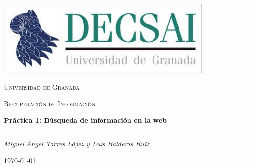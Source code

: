 



	
	\begin{titlepage}
		\centering
		\includegraphics[width=0.8\textwidth]{decsai.jpeg}\par\vspace{1cm}
		{\scshape\LARGE Universidad de Granada \par}
		\vspace{1cm}
		{\scshape\Large Recuperaci\'on de Informaci\'on \par}
		\vspace{1.5cm}
		{\huge\bfseries Pr\'actica 1: B\'usqueda de informaci\'on en la web\par}
		\vspace{0.2cm}
		\noindent\rule{\textwidth}{2pt}
		\vspace{2cm}
		{\Large\itshape Miguel \'Angel Torres L\'opez y Luis Balderas Ruiz\par}
		
		\vfill
		
		{\large \today\par}
	\end{titlepage}
	
	\tableofcontents
	
	\newpage
	
